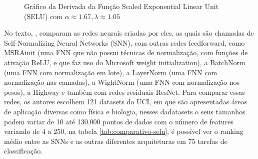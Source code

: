 \begin{figure}[h!]
    \centering
    \caption{Gráfico da Derivada da Função Scaled Exponential Linear Unit (SELU) com $\alpha \approx 1.67, \lambda \approx 1.05$}
    \label{fig:selu-derivada}
\end{figure}

No texto, \textcite{SELUArticle}, comparam as redes neurais criadas por eles, as quais são chamadas de Self-Normalizing Neural Networks (SNN), com outras redes feedforward, como MSRAinit (uma FNN que não possui técnicas de normalização, com funções de ativação ReLU, e que faz uso do Microsoft weight initialization), a BatchNorm (uma FNN com normalização em lote), a LayerNorm (uma FNN com normalização nas camadas), a WightNorm (uma FNN com normalização nos pesos), a Highway e também com redes residuais ResNet. Para comparar essas redes, os autores escolhem 121 datasets do UCI, em que são apresentadas áreas de aplicação diversas como física e biologia, nesses dadatasets o seus tamanhos podem variar de 10 até 130.000 pontos de dados com o número de features variando de 4 a 250, na tabela \ref{tab:comparativo-selu}, é possível ver o ranking médio entre as SNNs e as outras diferentes arquiteturas em 75 tarefas de classificação.

